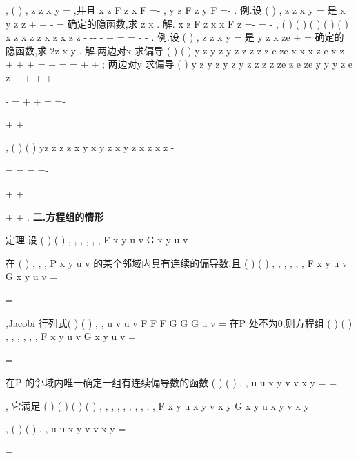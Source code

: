 ,
(
)
,
z
z x
y
=
,并且
x
z
F
z
x
F
\partial =-
\partial 
,
y
z
F
z
y
F
\partial =-
\partial 
. 
\textcolor{lyred}{例}.设
(
)
,
z
z x y
=
是
x
y
z
z
+
+
-
=
确定的隐函数,求
z
x
\partial 
\partial 
. 
解.
x
z
F
z
x
x
F
z
\partial =-
=
\partial 
-
,
(
)
(
)
(
)
(
)
(
)
x
z
x
z
z
x
z
x
z
z
-
-\cdots -
-
+
\partial 
=
=
\partial 
-
-
. 
\textcolor{lyred}{例}.设
(
)
,
z
z x y
=
是
y z
x
ze +
=
确定的隐函数,求
2z
x y
\partial 
\partial \partial . 
解.两边对x 求偏导
(
)
(
)
y z
y z
y z
z
z
z
z
e
ze
x
x
x
z e
x
z
+
+
+
\partial 
\partial 
\partial 
\Rightarrow =
+
\Rightarrow 
=
=
\partial 
\partial 
\partial 
+
+
; 
两边对y 求偏导
(
)
y z
y z
y z
y z
z
z
z
ze
z
e
ze
y
y
y
z e
z
+
+
+
+


\partial 
\partial 
\partial 
-
\Rightarrow 
=
+
+
\Rightarrow 
=
=-


\partial 
\partial 
\partial 
+
+


, 
(
)
(
)
yz
z
z
z
x y
x
y
z
x
y
z
x
z
x
z
\partial 
\partial 
\partial 
-




=
\cdots 
=
\cdots 
=
=-




\partial \partial 
\partial 
+
\partial 
+




+
+
. 
\vspace{4pt}
{\bfseries \textcolor{lyred}{二.方程组的情形}}

\textcolor{lyred}{定理}.设
(
)
(
)
, , ,
, , ,
F x y u v
G x y u v

在
(
)
,
,
,
P x
y u v
的某个邻域内具有连续的偏导数,且 
(
)
(
)
,
,
,
,
,
,
F x
y u v
G x
y u v
=

=

,\textcolor{lyred}{Jacobi 行列式}(
)
(
)
,
,
u
v
u
v
F
F
F G
G
G
u v
\partial 
=
\partial 
在P 处不为0,则方程组 
(
)
(
)
, , ,
, , ,
F x y u v
G x y u v
=

=

在P 的邻域内唯一确定一组有连续偏导数的函数
(
)
(
)
,
,
u
u x y
v
v x y
=
=

, 
它满足
(
)
(
)
(
)
(
)
, ,
,
,
,
, ,
,
,
,
F x y u x y
v x y
G x y u x y
v x y

\equiv 






\equiv 






,
(
)
(
)
,
,
u
u x
y
v
v x
y
=

=

